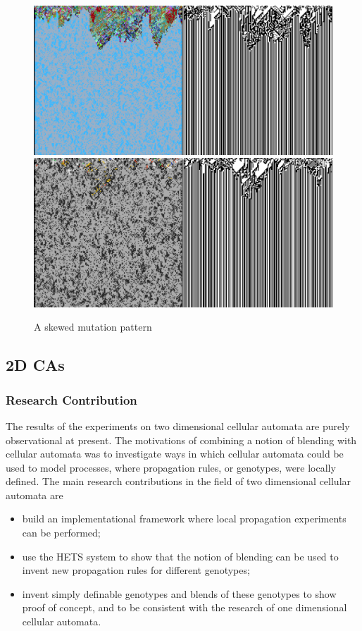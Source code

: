 \documentclass{AISB2008}
\begin{document}
\begin{figure}
\includegraphics[width=\columnwidth]{reef.png} \newline
\includegraphics[width=\columnwidth]{eoc.png} 
\caption{A skewed mutation pattern \label{reef}}
\end{figure}

\subsection{2D CAs} \label{2d-results}

\subsubsection{Research Contribution}

The results of the experiments on two dimensional cellular automata
are purely observational at present. The motivations of combining a
notion of blending with cellular automata was to investigate ways in
which cellular automata could be used to model processes, where
propagation rules, or genotypes, were locally defined. The main
research contributions in the field of two dimensional cellular
automata are
\begin{itemize}
\item build an implementational framework where local propagation
  experiments can be performed;
\item use the HETS system to show that the notion of blending can be
  used to invent new propagation rules for different genotypes;
\item invent simply definable genotypes and blends of these genotypes
  to show proof of concept, and to be consistent with the research of
  one dimensional cellular automata.
\end{itemize}
\end{document}
